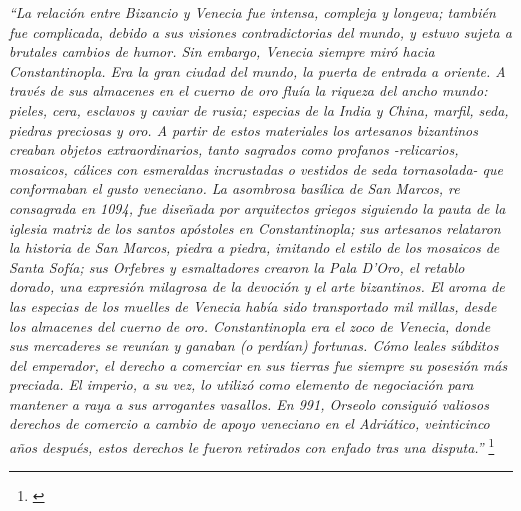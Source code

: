 \textit{“La relación entre Bizancio y Venecia fue intensa, compleja y longeva; 
también fue complicada, debido a sus visiones contradictorias del mundo, 
y estuvo sujeta a brutales cambios de humor. Sin embargo, Venecia siempre 
miró hacia Constantinopla. Era la gran ciudad del mundo, la puerta de 
entrada a oriente. A través de sus almacenes en el cuerno de oro fluía 
la riqueza del ancho mundo: pieles, cera, esclavos y caviar de rusia; 
especias de la India y China, marfil, seda, piedras preciosas y oro. 
A partir de estos materiales los artesanos bizantinos creaban objetos 
extraordinarios, tanto sagrados como profanos -relicarios, mosaicos, 
cálices con esmeraldas incrustadas o vestidos de seda tornasolada- 
que conformaban el gusto veneciano. La asombrosa basílica de San Marcos, 
re consagrada en 1094, fue diseñada por arquitectos griegos siguiendo la 
pauta de la iglesia matriz de los santos apóstoles en Constantinopla; 
sus artesanos relataron la historia de San Marcos, piedra a piedra, 
imitando el estilo de los mosaicos de Santa Sofía; sus Orfebres y 
esmaltadores crearon la Pala D’Oro, el retablo dorado, una expresión 
milagrosa de la devoción y el arte bizantinos. 
El aroma de las especias de los muelles de Venecia había sido 
transportado mil millas, desde los almacenes del cuerno de oro. 
Constantinopla era el zoco de Venecia, donde sus mercaderes se reunían y
 ganaban (o perdían) fortunas. Cómo leales súbditos del emperador, 
 el derecho a comerciar en sus tierras fue siempre su posesión 
 más preciada. El imperio, a su vez, lo utilizó como elemento de 
 negociación para mantener a raya a sus arrogantes vasallos. 
 En 991, Orseolo consiguió valiosos derechos de comercio a cambio 
 de apoyo veneciano en el Adriático, veinticinco años después, 
 estos derechos le fueron retirados con enfado tras una disputa.”
 }\footnote{\cite[pp.~39--40]{venecia}}












